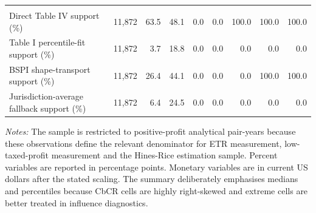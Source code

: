 \begin{table}[H]
{\begin{tabular}{@{}lrrrrrrrr@{}}
\addlinespace
\multicolumn{9}{l}{\textit{Panel E: Measurement support}} \\
Direct Table IV support (\%) & 11,872 & 63.5 & 48.1 & 0.0 & 0.0 & 100.0 & 100.0 & 100.0 \\
Table I percentile-fit support (\%) & 11,872 & 3.7 & 18.8 & 0.0 & 0.0 & 0.0 & 0.0 & 0.0 \\
BSPI shape-transport support (\%) & 11,872 & 26.4 & 44.1 & 0.0 & 0.0 & 0.0 & 100.0 & 100.0 \\
Jurisdiction-average fallback support (\%) & 11,872 & 6.4 & 24.5 & 0.0 & 0.0 & 0.0 & 0.0 & 0.0 \\
\bottomrule
\end{tabular}
}

\vspace{0.5em}
\begin{minipage}{0.96\textwidth}
\footnotesize\raggedright \textit{Notes:} The sample is restricted to positive-profit analytical pair-years because these observations define the relevant denominator for ETR measurement, low-taxed-profit measurement and the Hines-Rice estimation sample. Percent variables are reported in percentage points. Monetary variables are in current US dollars after the stated scaling. The summary deliberately emphasises medians and percentiles because CbCR cells are highly right-skewed and extreme cells are better treated in influence diagnostics.
\end{minipage}
\end{table}
